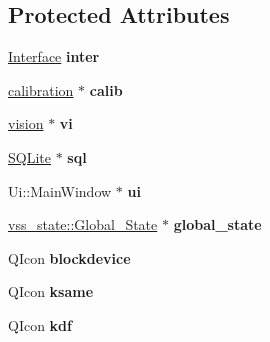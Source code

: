 \subsection*{Protected Attributes}
\begin{DoxyCompactItemize}
\item 
\hyperlink{classInterface}{Interface} {\bfseries inter}\hypertarget{classMainWindow_ad242666fbf3bdf53bae55cbc178a7b05}{}\label{classMainWindow_ad242666fbf3bdf53bae55cbc178a7b05}

\item 
\hyperlink{classcalibration}{calibration} $\ast$ {\bfseries calib}\hypertarget{classMainWindow_ae41ab8a2caab2b5b1a1432ce15eb0e51}{}\label{classMainWindow_ae41ab8a2caab2b5b1a1432ce15eb0e51}

\item 
\hyperlink{classvision}{vision} $\ast$ {\bfseries vi}\hypertarget{classMainWindow_aed5906811bbf1191aa952deb4279e36f}{}\label{classMainWindow_aed5906811bbf1191aa952deb4279e36f}

\item 
\hyperlink{classSQLite}{S\+Q\+Lite} $\ast$ {\bfseries sql}\hypertarget{classMainWindow_a27a47dcf3589dd010ce7803cb3b2ff85}{}\label{classMainWindow_a27a47dcf3589dd010ce7803cb3b2ff85}

\item 
Ui\+::\+Main\+Window $\ast$ {\bfseries ui}\hypertarget{classMainWindow_a35466a70ed47252a0191168126a352a5}{}\label{classMainWindow_a35466a70ed47252a0191168126a352a5}

\item 
\hyperlink{classvss__state_1_1Global__State}{vss\+\_\+state\+::\+Global\+\_\+\+State} $\ast$ {\bfseries global\+\_\+state}\hypertarget{classMainWindow_a6b6de60876dfab34a424a2603a5edb82}{}\label{classMainWindow_a6b6de60876dfab34a424a2603a5edb82}

\item 
Q\+Icon {\bfseries blockdevice}\hypertarget{classMainWindow_add3756176df4e7230246c550d9b6e2db}{}\label{classMainWindow_add3756176df4e7230246c550d9b6e2db}

\item 
Q\+Icon {\bfseries ksame}\hypertarget{classMainWindow_ac1beb6db1d37a2a6c3d66688aefd9a66}{}\label{classMainWindow_ac1beb6db1d37a2a6c3d66688aefd9a66}

\item 
Q\+Icon {\bfseries kdf}\hypertarget{classMainWindow_a9d4567d65912ab7578d00827129c4755}{}\label{classMainWindow_a9d4567d65912ab7578d00827129c4755}


\end{DoxyCompactItemize}
